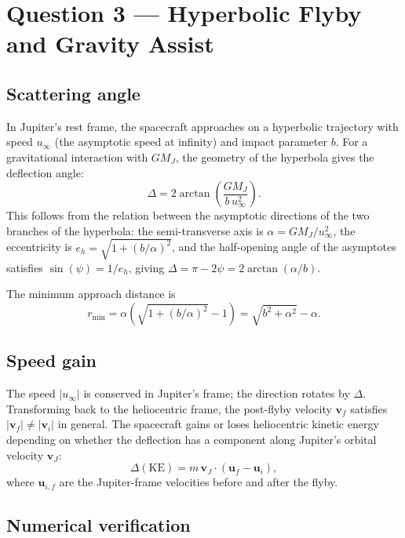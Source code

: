 \documentclass[11pt, a4paper]{article}
\begin{document}
\section{Question 3 — Hyperbolic Flyby and Gravity Assist}

\subsection*{Scattering angle}

In Jupiter's rest frame, the spacecraft approaches on a hyperbolic trajectory with
speed $u_\infty$ (the asymptotic speed at infinity) and impact parameter $b$.
For a gravitational interaction with $GM_J$, the geometry of the hyperbola gives the
deflection angle:
\begin{equation}
  \boxed{\Delta = 2\arctan\!\left(\frac{GM_J}{b\,u_\infty^2}\right).}
  \label{eq:delta}
\end{equation}
This follows from the relation between the asymptotic directions of the two branches
of the hyperbola: the semi-transverse axis is $\alpha = GM_J/u_\infty^2$, the
eccentricity is $e_h = \sqrt{1+(b/\alpha)^2}$, and the half-opening angle of the
asymptotes satisfies $\sin(\psi) = 1/e_h$, giving $\Delta = \pi - 2\psi = 2\arctan(\alpha/b)$.

The minimum approach distance is
\begin{equation}
  r_{\min} = \alpha\!\left(\sqrt{1+(b/\alpha)^2} - 1\right)
           = \sqrt{b^2 + \alpha^2} - \alpha.
  \label{eq:rmin}
\end{equation}

\subsection*{Speed gain}

The speed $|u_\infty|$ is conserved in Jupiter's frame; the direction rotates by $\Delta$.
Transforming back to the heliocentric frame, the post-flyby velocity $\mathbf{v}_f$
satisfies $|\mathbf{v}_f| \neq |\mathbf{v}_i|$ in general.  The spacecraft gains or
loses heliocentric kinetic energy depending on whether the deflection has a component
along Jupiter's orbital velocity $\mathbf{v}_J$:
\[
  \Delta(\text{KE}) = m\,\mathbf{v}_J \cdot (\mathbf{u}_f - \mathbf{u}_i),
\]
where $\mathbf{u}_{i,f}$ are the Jupiter-frame velocities before and after the flyby.

\subsection*{Numerical verification}
\end{document}
